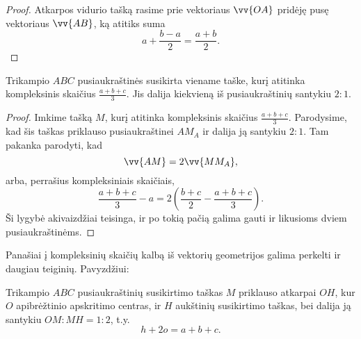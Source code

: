 \documentclass[11pt,a4paper,twoside]{book}
\begin{document}
\begin{proof}
  Atkarpos vidurio tašką rasime prie vektoriaus $\vv{OA}$ pridėję pusę
  vektoriaus $\vv{AB}$, ką atitiks suma
  $$
  a + \frac{b - a}{2} = \frac{a + b}{2}.
  $$
\end{proof}

\begin{teig}
  Trikampio $ABC$ pusiaukraštinės susikirta viename taške, kurį atitinka
  kompleksinis skaičius $\frac{a + b + c}{3}$. Jis dalija kiekvieną iš
  pusiaukraštinių santykiu $2:1$.
\end{teig}

\begin{proof}
  Imkime tašką $M$, kurį atitinka kompleksinis skaičius $\frac{a + b + c}{3}$.
  Parodysime, kad šis taškas priklauso pusiaukraštinei $AM_{A}$ ir dalija ją
  santykiu $2:1$. Tam pakanka parodyti, kad 
  $$
  \vv{AM} = 2\vv{MM_{A}},
  $$
  arba, perrašius kompleksiniais skaičiais,
  $$
  \frac{a + b + c}{3} - a = 2\left(\frac{b+c}{2} - \frac{a + b + c}{3}\right).
  $$
  Ši lygybė akivaizdžiai teisinga, ir po tokią pačią galima gauti ir likusioms
  dviem pusiaukraštinėms.
\end{proof}

Panašiai į kompleksinių skaičių kalbą iš vektorių geometrijos galima perkelti ir
daugiau teiginių. Pavyzdžiui:

%

\begin{thm}
  Trikampio $ABC$ pusiaukraštinių
  susikirtimo taškas $M$ priklauso atkarpai $OH$, kur $O$ apibrėžtinio
  apskritimo centras,  ir $H$ aukštinių susikirtimo taškas, bei dalija ją
  santykiu $OM:MH = 1:2$, t.y.
  $$
  h  + 2o = a + b + c.
  $$
\end{thm}
\end{document}
